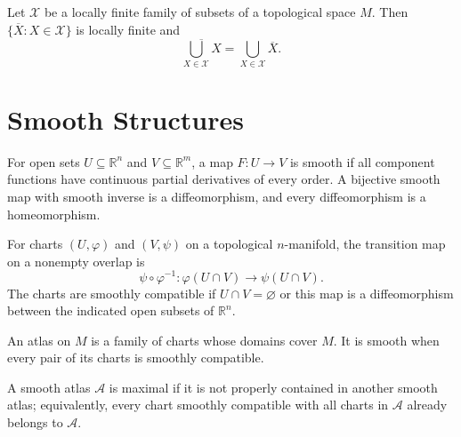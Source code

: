 \begin{lemma}
\label{lem:1-13}



Let $\mathcal X$ be a locally finite family of subsets of a topological space
$M$. Then $\{\overline X:X\in\mathcal X\}$ is locally finite and
\[
\overline{\bigcup_{X\in\mathcal X}X}
=\bigcup_{X\in\mathcal X}\overline X.
\]
\end{lemma}



\section{Smooth Structures}

\begin{definition}
\label{def:1-2-extra-1}



For open sets $U\subseteq\mathbb R^n$ and $V\subseteq\mathbb R^m$, a map
$F:U\to V$ is smooth if all component functions have continuous partial
derivatives of every order. A bijective smooth map with smooth inverse is a
diffeomorphism, and every diffeomorphism is a homeomorphism.
\end{definition}

\begin{definition}
\label{def:1-2-extra-2}



For charts $(U,\varphi)$ and $(V,\psi)$ on a topological $n$-manifold, the
transition map on a nonempty overlap is
\[
\psi\circ\varphi^{-1}:\varphi(U\cap V)\longrightarrow\psi(U\cap V).
\]
The charts are smoothly compatible if $U\cap V=\varnothing$ or this map is a
diffeomorphism between the indicated open subsets of $\mathbb R^n$.
\end{definition}

\begin{definition}
\label{def:1-2-extra-3}




An atlas on $M$ is a family of charts whose domains cover $M$. It is smooth
when every pair of its charts is smoothly compatible.
\end{definition}

\begin{definition}
\label{def:1-2-extra-4}



A smooth atlas $\mathcal A$ is maximal if it is not properly contained in
another smooth atlas; equivalently, every chart smoothly compatible with all
charts in $\mathcal A$ already belongs to $\mathcal A$.
\end{definition}

